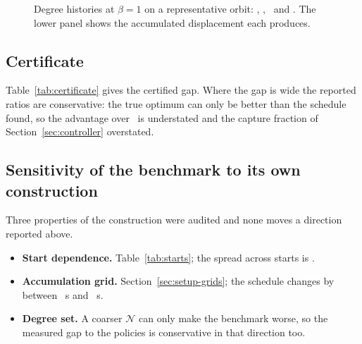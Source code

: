 \begin{figure}[!tbp]
  \centering
  \caption{Degree histories at $\beta=1$ on a representative orbit:
  \Fop, \Rint, \Asens\ and \Asign. The lower panel shows the accumulated
  displacement each produces.}
  \label{fig:schedules}
\end{figure}

\subsection{Certificate}

Table~\ref{tab:certificate} gives the certified gap. 
 Where the gap is
wide the reported ratios are conservative: the true optimum can only be better
than the schedule found, so the advantage over \Fop\ is understated and the
capture fraction of Section~\ref{sec:controller} overstated.

\subsection{Sensitivity of the benchmark to its own construction}

Three properties of the construction were audited and none moves a direction
reported above. 

\begin{itemize}
  \item \textbf{Start dependence.} Table~\ref{tab:starts}; the spread across
     starts is .
  \item \textbf{Accumulation grid.} Section~\ref{sec:setup-grids}; the schedule
    changes by  between ~s and ~s.
  \item \textbf{Degree set.}  A coarser $\mathcal{N}$ can only
    make the benchmark worse, so the measured gap to the policies is
    conservative in that direction too.
\end{itemize}

